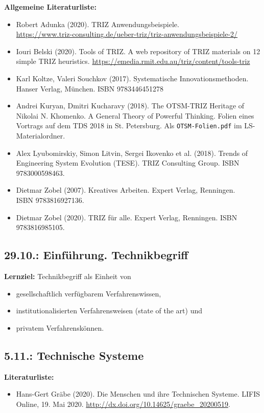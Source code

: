 \documentclass[11pt,a4paper]{article}
\begin{document}
\textbf{Allgemeine Literaturliste:}
\begin{itemize}[noitemsep]
\item Robert Adunka (2020). TRIZ Anwendungsbeispiele. \\
  \url{https://www.triz-consulting.de/ueber-triz/triz-anwendungsbeispiele-2/} 
\item Iouri Belski (2020). Tools of TRIZ. A web repository of TRIZ materials
  on 12 simple TRIZ heuristics.
  \url{https://emedia.rmit.edu.au/triz/content/tools-triz}
\item Karl Koltze, Valeri Souchkov (2017). Systematische Innovationsmethoden.
  Hanser Verlag, München. ISBN 9783446451278
\item Andrei Kuryan, Dmitri Kucharavy (2018). The OTSM-TRIZ Heritage of
  Nikolai N. Khomenko. A General Theory of Powerful Thinking. Folien eines
  Vortrags auf dem TDS 2018 in St. Petersburg. Als \texttt{OTSM-Folien.pdf} im
  LS-Materialordner.
\item Alex Lyubomirskiy, Simon Litvin, Sergei Ikovenko et al. (2018). Trends
  of Engineering System Evolution (TESE).  TRIZ Consulting Group. ISBN
  9783000598463.
\item Dietmar Zobel (2007). Kreatives Arbeiten. Expert Verlag, Renningen.\\
  ISBN 9783816927136.
\item Dietmar Zobel (2020). TRIZ für alle. Expert Verlag, Renningen. ISBN
  9783816985105.
\end{itemize}
\vfill
\tableofcontents
\newpage
\subsection{29.10.: Einführung. Technikbegriff}

\textbf{Lernziel:}
Technikbegriff als Einheit von 
\begin{itemize}[noitemsep]
\item gesellschaftlich verfügbarem Verfahrenswissen,
\item institutionalisierten Verfahrensweisen (state of the art) und
\item privatem Verfahrenskönnen.
\end{itemize}

\subsection{5.11.: Technische Systeme}

\textbf{Literaturliste:}
\begin{itemize}[noitemsep]
\item Hans-Gert Gräbe (2020). Die Menschen und ihre Technischen Systeme. LIFIS
  Online, 19. Mai 2020. \url{http://dx.doi.org/10.14625/graebe_20200519}.
\end{itemize}
\end{document}
